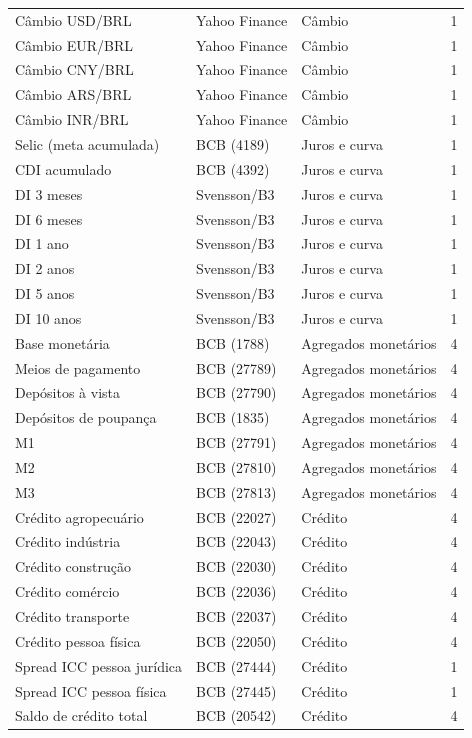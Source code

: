 \documentclass[preprint,authoryear,review,12pt]{elsarticle}
\begin{document}
\begin{ThreePartTable}
\begin{longtable}{@{}p{5.2cm} l l c@{}}
Câmbio USD/BRL & Yahoo Finance & Câmbio & 1 \\
Câmbio EUR/BRL & Yahoo Finance & Câmbio & 1 \\
Câmbio CNY/BRL & Yahoo Finance & Câmbio & 1 \\
Câmbio ARS/BRL & Yahoo Finance & Câmbio & 1 \\
Câmbio INR/BRL & Yahoo Finance & Câmbio & 1 \\
Selic (meta acumulada) & BCB (4189) & Juros e curva & 1 \\
CDI acumulado & BCB (4392) & Juros e curva & 1 \\
DI 3 meses & Svensson/B3 & Juros e curva & 1 \\
DI 6 meses & Svensson/B3 & Juros e curva & 1 \\
DI 1 ano & Svensson/B3 & Juros e curva & 1 \\
DI 2 anos & Svensson/B3 & Juros e curva & 1 \\
DI 5 anos & Svensson/B3 & Juros e curva & 1 \\
DI 10 anos & Svensson/B3 & Juros e curva & 1 \\
Base monetária & BCB (1788) & Agregados monetários & 4 \\
Meios de pagamento & BCB (27789) & Agregados monetários & 4 \\
Depósitos à vista & BCB (27790) & Agregados monetários & 4 \\
Depósitos de poupança & BCB (1835) & Agregados monetários & 4 \\
M1 & BCB (27791) & Agregados monetários & 4 \\
M2 & BCB (27810) & Agregados monetários & 4 \\
M3 & BCB (27813) & Agregados monetários & 4 \\
Crédito agropecuário & BCB (22027) & Crédito & 4 \\
Crédito indústria & BCB (22043) & Crédito & 4 \\
Crédito construção & BCB (22030) & Crédito & 4 \\
Crédito comércio & BCB (22036) & Crédito & 4 \\
Crédito transporte & BCB (22037) & Crédito & 4 \\
Crédito pessoa física & BCB (22050) & Crédito & 4 \\
Spread ICC pessoa jurídica & BCB (27444) & Crédito & 1 \\
Spread ICC pessoa física & BCB (27445) & Crédito & 1 \\
Saldo de crédito total & BCB (20542) & Crédito & 4 \\

\end{longtable}
\end{ThreePartTable}
\end{document}
